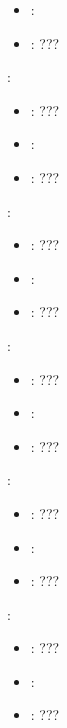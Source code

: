 \begin{itemize}
{\begin{itemize}
                \item \optionDefaultValue{}: 
                \item \optionDescrption{}: ???
           \end{itemize}
    \item {}:
           \begin{itemize}
                \item \optionPossibleValues{}: ???
                \item \optionDefaultValue{}: 
                \item \optionDescrption{}: ???
           \end{itemize}
    \item {}:
           \begin{itemize}
                \item \optionPossibleValues{}: ???
                \item \optionDefaultValue{}: 
                \item \optionDescrption{}: ???
           \end{itemize}
    \item {}:
           \begin{itemize}
                \item \optionPossibleValues{}: ???
                \item \optionDefaultValue{}: 
                \item \optionDescrption{}: ???
           \end{itemize}
    \item {}:
           \begin{itemize}
                \item \optionPossibleValues{}: ???
                \item \optionDefaultValue{}: 
                \item \optionDescrption{}: ???
           \end{itemize}
    \item {}:
           \begin{itemize}
                \item \optionPossibleValues{}: ???
                \item \optionDefaultValue{}: 
                \item \optionDescrption{}: ???
           \end{itemize}
      }
\end{itemize}


